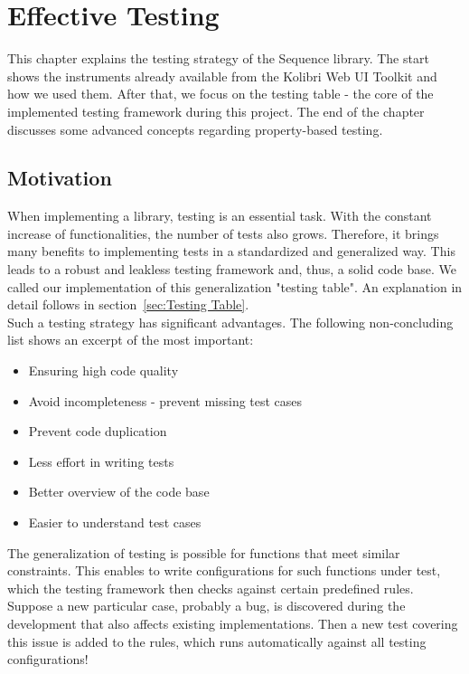 \chapter{Effective Testing}
\label{chap:Effective_Testing}
This chapter explains the testing strategy of the Sequence library. The start
shows the instruments already available from the Kolibri Web UI Toolkit and how
we used them. After that, we focus on the testing table - the core of
the implemented testing framework during this project. The end of the chapter
discusses some advanced concepts regarding property-based testing.

\section{Motivation}
\label{sec:Motivation}
When implementing a library, testing is an essential task. With the constant
increase of functionalities, the number of tests also grows. Therefore, it
brings many benefits to implementing tests in a standardized and generalized
way. This leads to a robust and leakless testing framework and, thus, a solid
code base. We called our implementation of this generalization "testing table".
An explanation in detail follows in section~\ref{sec:Testing Table}. \\
Such a testing strategy has significant advantages. The following
non-concluding list shows an excerpt of the most important:

\begin{itemize}
  \item{Ensuring high code quality}
  \item{Avoid incompleteness - prevent missing test cases}
  \item{Prevent code duplication}
  \item{Less effort in writing tests}
  \item{Better overview of the code base}
  \item{Easier to understand test cases}
\end{itemize}

The generalization of testing is possible for functions that meet similar
constraints. This enables to write configurations for such functions under
test, which the testing framework then checks against certain predefined rules.
Suppose a new particular case, probably a bug, is discovered during the
development that also affects existing implementations. Then a new test
covering this issue is added to the rules, which runs automatically against all
testing configurations!

